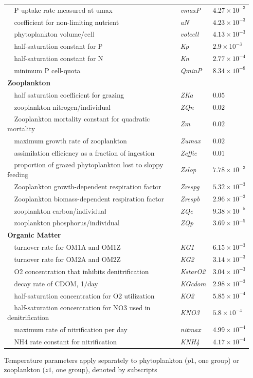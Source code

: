 \documentclass[preprint]{elsarticle}\usepackage[]{graphicx}\usepackage[]{color}
\begin{document}
\begin{table}[!tbp]
{\begin{center}
\begin{tabular}{lll}
~~P-uptake rate measured at umax&\textit{vmaxP}&$4.27\times 10^{-3}$\tabularnewline
~~coefficient for non-limiting nutrient&\textit{aN}&$4.23\times 10^{-3}$\tabularnewline
~~phytoplankton volume/cell&\textit{volcell}&$4.13\times 10^{-3}$\tabularnewline
~~half-saturation constant for P&\textit{Kp}&$2.9\times 10^{-3}$\tabularnewline
~~half-saturation constant for N&\textit{Kn}&$2.77\times 10^{-4}$\tabularnewline
~~minimum P cell-quota&\textit{QminP}&$8.34\times 10^{-8}$\tabularnewline
\hline
{\bfseries Zooplankton}&&\tabularnewline
~~half saturation coefficient for grazing&\textit{ZKa}&$0.05$\tabularnewline
~~zooplankton nitrogen/individual&\textit{ZQn}&$0.02$\tabularnewline
~~Zooplankton mortality constant for quadratic mortality&\textit{Zm}&$0.02$\tabularnewline
~~maximum growth rate of zooplankton&\textit{Zumax}&$0.02$\tabularnewline
~~assimilation efficiency as a fraction of ingestion&\textit{Zeffic}&$0.01$\tabularnewline
~~proportion of grazed phytoplankton lost to sloppy feeding&\textit{Zslop}&$7.78\times 10^{-3}$\tabularnewline
~~Zooplankton growth-dependent respiration factor&\textit{Zrespg}&$5.32\times 10^{-3}$\tabularnewline
~~Zooplankton biomass-dependent respiration factor&\textit{Zrespb}&$2.96\times 10^{-3}$\tabularnewline
~~zooplankton carbon/individual&\textit{ZQc}&$9.38\times 10^{-5}$\tabularnewline
~~zooplankton phosphorus/individual&\textit{ZQp}&$3.69\times 10^{-5}$\tabularnewline
\hline
{\bfseries Organic Matter}&&\tabularnewline
~~turnover rate for OM1A and OM1Z&\textit{KG1}&$6.15\times 10^{-3}$\tabularnewline
~~turnover rate for OM2A and OM2Z&\textit{KG2}&$3.14\times 10^{-3}$\tabularnewline
~~O2 concentration that inhibits denitrification&\textit{KstarO2}&$3.04\times 10^{-3}$\tabularnewline
~~decay rate of CDOM, 1/day&\textit{KGcdom}&$2.98\times 10^{-3}$\tabularnewline
~~half-saturation concentration for O2 utilization&\textit{KO2}&$5.85\times 10^{-4}$\tabularnewline
~~half-saturation concentration for NO3 used in denitrification&\textit{KNO3}&$5.8\times 10^{-4}$\tabularnewline
~~maximum rate of nitrification per day&\textit{nitmax}&$4.99\times 10^{-4}$\tabularnewline
~~NH4 rate constant for nitrification&\textit{KNH4}&$4.17\times 10^{-4}$\tabularnewline
\hline
\end{tabular}\end{center}}
\footnotesize *Temperature parameters apply separately to phytoplankton ($p1$, one group) or zooplankton ($z1$, one group), denoted by subscripts\end{table}
\end{document}

